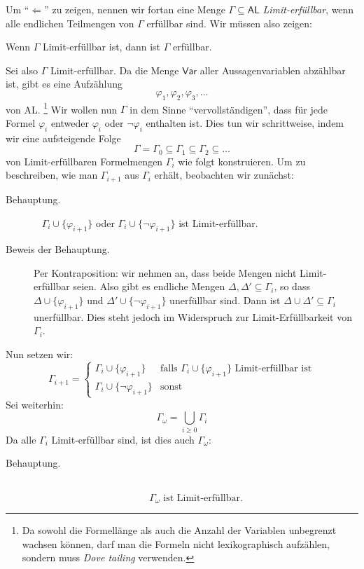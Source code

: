 \documentclass[fontsize=11pt, twoside=false, numbers=autoenddot]{scrbook}
\begin{document}
\begin{beweis}
  Um "`$\Leftarrow$"' zu zeigen,
  nennen wir fortan eine Menge $\Gamma \subseteq \textsf{AL}$ \emph{Limit-erfüllbar},
  wenn alle endlichen Teilmengen von $\Gamma$ erfüllbar sind.
  Wir müssen also zeigen:
  \begin{center}
    Wenn $\Gamma$ Limit-erfüllbar ist, dann ist $\Gamma$ erfüllbar.
  \end{center}
  Sei also $\Gamma$ Limit-erfüllbar.
  Da die Menge $\textsf{Var}$ aller Aussagenvariablen abzählbar ist,
  gibt es eine Aufzählung
  \[
    \varphi_1,\varphi_2,\varphi_3,\dots
  \]
  von \textsf{AL}.%
  \footnote{
    Da sowohl die Formellänge als auch die Anzahl der Variablen unbegrenzt wachsen können,
    darf man die Formeln nicht lexikographisch aufzählen,
    sondern muss \emph{Dove tailing} verwenden.%
  }
  Wir wollen nun $\Gamma$ in dem Sinne "`vervollständigen"',
  dass für jede Formel $\varphi_i$ entweder $\varphi_i$ oder $\lnot\varphi_i$
  enthalten ist.
  Dies tun wir schrittweise, indem wir eine aufsteigende Folge
  \[
    \Gamma = \Gamma_0 \subseteq \Gamma_1 \subseteq \Gamma_2 \subseteq \dots
  \]
  von Limit-erfüllbaren Formelmengen $\Gamma_i$ wie folgt konstruieren.
  Um zu beschreiben, wie man $\Gamma_{i+1}$ aus $\Gamma_i$ erhält,
  beobachten wir zunächst:
  \begin{description}
    \item[Behauptung.]~
      $\Gamma_i \cup \{\varphi_{i+1}\}$ oder
      $\Gamma_i \cup \{\lnot \varphi_{i+1}\}$ ist Limit-erfüllbar.
    \item[Beweis der Behauptung.]
      Per Kontraposition: wir nehmen an, dass beide Mengen nicht Limit-erfüllbar seien.
      Also gibt es endliche Mengen $\Delta,\Delta' \subseteq \Gamma_i$,
      so dass $\Delta \cup \{\varphi_{i+1}\}$ und
      $\Delta' \cup \{\lnot\varphi_{i+1}\}$ unerfüllbar sind.
      Dann ist $\Delta \cup \Delta' \subseteq \Gamma_i$ unerfüllbar.
      Dies steht jedoch im Widerspruch zur Limit-Erfüllbarkeit von $\Gamma_i$.
  \end{description}
  Nun setzen wir:
  \[
    \Gamma_{i+1} = \begin{cases}
                     \Gamma_i \cup \{\varphi_{i+1}\}       & \text{falls~} \Gamma_i \cup \{\varphi_{i+1}\} \text{~Limit-erfüllbar ist} \\
                     \Gamma_i \cup \{\lnot \varphi_{i+1}\} & \text{sonst}
                   \end{cases}
  \]
  Sei weiterhin:
  \[
    \Gamma_\omega = \bigcup_{i \geq 0} \Gamma_i
  \]
  Da alle $\Gamma_i$ Limit-erfüllbar sind, ist dies auch $\Gamma_\omega$:
  \begin{description}
    \item[Behauptung.]~
      \[
        \tag{$*$}
        \Gamma_\omega \text{~ist Limit-erfüllbar.}
      \]


\end{description}
\end{beweis}
\end{document}
